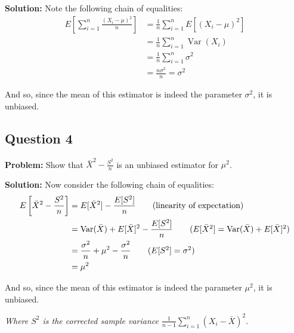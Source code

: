 \documentclass{article}
\DeclareMathOperator{\Var}{Var}
\begin{document}
\noindent\textbf{Solution:} Note the following chain of equalities:
\begin{align*}
  E\left[\sum_{i=1}^n\frac{(X_i-\mu)^2}{n}\right]&=\frac{1}{n}\sum_{i=1}^nE\left[(X_i-\mu)^2\right]\tag{linearity of expectation}\\
  &=\frac{1}{n}\sum_{i=1}^n\Var(X_i)\tag{def. of variance}\\
  &=\frac{1}{n}\sum_{i=1}^n\sigma^2\tag{def. $\sigma^2$}\\
  &=\frac{n\sigma^2}{n}=\sigma^2
\end{align*}

And so, since the mean of this estimator is indeed the parameter $\sigma^2$, it is unbiased.
\bigskip

\subsection*{Question 4}
\noindent\textbf{Problem:} Show that $\bar{X}^2-\frac{S^2}{n}$ is an unbiased estimator for $\mu^2$.
\bigskip

\noindent\textbf{Solution:} Now consider the following chain of equalities:
\begin{align*}
  E\left[\bar{X}^2-\frac{S^2}{n}\right]&=E[\bar{X}^2]-\frac{E[S^2]}{n}\tag{linearity of expectation}\\
  &=\Var(\bar{X})+E[\bar{X}]^2-\frac{E[S^2]}{n}\tag{$E[\bar{X}^2]=\Var(\bar{X})+E[\bar{X}]^2$}\\
  &=\frac{\sigma^2}{n}+\mu^2-\frac{\sigma^2}{n}\tag{$E[S^2]=\sigma^2$}\\
  &=\mu^2
\end{align*}

And so, since the mean of this estimator is indeed the parameter $\mu^2$, it is unbiased.
\bigskip

\textit{Where $S^2$ is the corrected sample variance $\frac{1}{n-1}\sum_{i=1}^n(X_i-\bar{X})^2$}.
\end{document}
